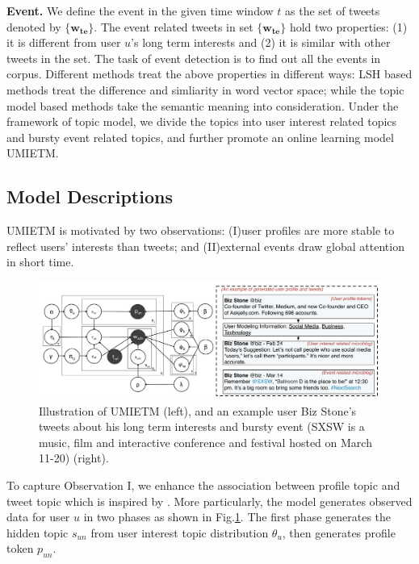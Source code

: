 \documentclass{llncs}
\begin{document}
\textbf{Event.} We define the event in the given time window \(t\) as the set of tweets denoted by \( \{ \bm{w_{te}}\}\).
The event related tweets in set \( \{ \bm{w_{te}}\}\)  hold two properties: (1) it is different from user \(u\)'s long term interests and (2) it is similar with other tweets in the set.
The task of event detection is to find out all the events in corpus.
Different methods treat the above properties in different ways: LSH based methods\cite{petrovic2010streaming} treat the difference and simliarity in word vector space; while the topic model based methods\cite{timeUserLDA2012finding} take the semantic meaning into consideration.
Under the framework of topic model, we divide the topics into user interest related topics and bursty event related topics, and further promote an online learning model UMIETM.

\subsection{Model Descriptions}
UMIETM is motivated by two observations: (I)user profiles are more stable to reflect users' interests than tweets; and (II)external events draw global attention in short time.
\begin{figure}
    \includegraphics[width=1.0\textwidth]{img/model.pdf}
    \caption{Illustration of UMIETM (left), and an example user Biz Stone's tweets about his long term interests and  bursty event (SXSW is a music, film and interactive conference and festival hosted on March 11-20) (right).} 
    \label{fig:modelUMIETM}
\end{figure}

To capture Observation I, we enhance the association between profile topic and tweet topic which is inspired by \cite{blei2003modeling}. 
More particularly, the model generates observed data for user \(u\) in two phases as shown in Fig.\ref{fig:modelUMIETM}. 
The first phase generates the hidden topic \(s_{un}\) from user interest topic distribution \(\theta_{u}\), then generates profile token \(p_{un}\).
 
\end{document}
